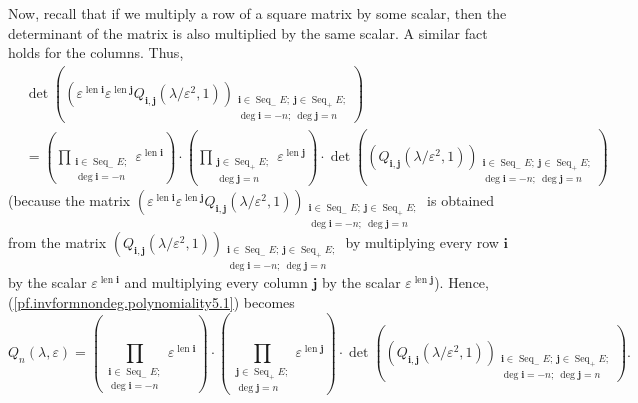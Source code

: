 \documentclass[etingof-lie.tex]{subfiles}
\begin{document}
Now, recall that if we multiply a row of a square matrix by some scalar, then
the determinant of the matrix is also multiplied by the same scalar. A similar
fact holds for the columns. Thus,
\begin{align*}
&  \det\left(  \left(  \varepsilon^{\operatorname*{len}\mathbf{i}}%
\varepsilon^{\operatorname*{len}\mathbf{j}}Q_{\mathbf{i},\mathbf{j}}\left(
\lambda/\varepsilon^{2},1\right)  \right)  _{\substack{\mathbf{i}%
\in\operatorname*{Seq}\nolimits_{-}E;\ \mathbf{j}\in\operatorname*{Seq}%
\nolimits_{+}E;\\\deg\mathbf{i}=-n;\ \deg\mathbf{j}=n}}\right) \\
&  =\left(  \prod\limits_{\substack{\mathbf{i}\in\operatorname*{Seq}%
\nolimits_{-}E;\\\deg\mathbf{i}=-n}}\varepsilon^{\operatorname*{len}%
\mathbf{i}}\right)  \cdot\left(  \prod\limits_{\substack{\mathbf{j}%
\in\operatorname*{Seq}\nolimits_{+}E;\\\deg\mathbf{j}=n}}\varepsilon
^{\operatorname*{len}\mathbf{j}}\right)  \cdot\det\left(  \left(
Q_{\mathbf{i},\mathbf{j}}\left(  \lambda/\varepsilon^{2},1\right)  \right)
_{\substack{\mathbf{i}\in\operatorname*{Seq}\nolimits_{-}E;\ \mathbf{j}%
\in\operatorname*{Seq}\nolimits_{+}E;\\\deg\mathbf{i}=-n;\ \deg\mathbf{j}%
=n}}\right)
\end{align*}
(because the matrix $\left(  \varepsilon^{\operatorname*{len}\mathbf{i}%
}\varepsilon^{\operatorname*{len}\mathbf{j}}Q_{\mathbf{i},\mathbf{j}}\left(
\lambda/\varepsilon^{2},1\right)  \right)  _{\substack{\mathbf{i}%
\in\operatorname*{Seq}\nolimits_{-}E;\ \mathbf{j}\in\operatorname*{Seq}%
\nolimits_{+}E;\\\deg\mathbf{i}=-n;\ \deg\mathbf{j}=n}}$ is obtained from the
matrix $\left(  Q_{\mathbf{i},\mathbf{j}}\left(  \lambda/\varepsilon
^{2},1\right)  \right)  _{\substack{\mathbf{i}\in\operatorname*{Seq}%
\nolimits_{-}E;\ \mathbf{j}\in\operatorname*{Seq}\nolimits_{+}E;\\\deg
\mathbf{i}=-n;\ \deg\mathbf{j}=n}}$ by multiplying every row $\mathbf{i}$ by
the scalar $\varepsilon^{\operatorname*{len}\mathbf{i}}$ and multiplying every
column $\mathbf{j}$ by the scalar $\varepsilon^{\operatorname*{len}\mathbf{j}%
}$). Hence, (\ref{pf.invformnondeg.polynomiality5.1}) becomes%
\begin{equation}
Q_{n}\left(  \lambda,\varepsilon\right)  =\left(  \prod
\limits_{\substack{\mathbf{i}\in\operatorname*{Seq}\nolimits_{-}%
E;\\\deg\mathbf{i}=-n}}\varepsilon^{\operatorname*{len}\mathbf{i}}\right)
\cdot\left(  \prod\limits_{\substack{\mathbf{j}\in\operatorname*{Seq}%
\nolimits_{+}E;\\\deg\mathbf{j}=n}}\varepsilon^{\operatorname*{len}\mathbf{j}%
}\right)  \cdot\det\left(  \left(  Q_{\mathbf{i},\mathbf{j}}\left(
\lambda/\varepsilon^{2},1\right)  \right)  _{\substack{\mathbf{i}%
\in\operatorname*{Seq}\nolimits_{-}E;\ \mathbf{j}\in\operatorname*{Seq}%
\nolimits_{+}E;\\\deg\mathbf{i}=-n;\ \deg\mathbf{j}=n}}\right)  .
\label{pf.invformnondeg.polynomiality5.3}%
\end{equation}
\end{document}
